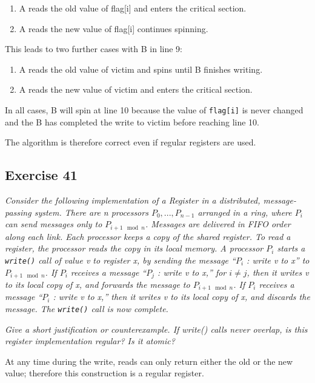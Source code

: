 \documentclass[a4paper,10pt]{article}
\begin{document}
\begin{enumerate}
\item A reads the old value of flag[i] and enters the critical section.
\item A reads the new value of flag[i] continues spinning.
\end{enumerate}

This leads to two further cases with B in line 9:

\begin{enumerate}
\item A reads the old value of victim and spins until B finishes writing.
\item A reads the new value of victim and enters the critical section.
\end{enumerate}

In all cases, B will spin at line 10 because the value of \lstinline|flag[i]| is never
changed and the B has completed the write to victim before reaching line 10.

The algorithm is therefore correct even if regular registers are used.

\subsection{Exercise 41}

\emph{Consider the following implementation of a Register in a distributed, 
message-passing system. There are n processors $P_0, ..., P_{n-1}$ arranged in
a ring, where $P_i$ can send messages only to $P_{i+1 \mod n}$. Messages are delivered
in FIFO order along each link.
Each processor keeps a copy of the shared register.
To read a register, the processor reads the copy in its local memory.
A processor $P_i$ starts a \lstinline|write()| call of value v to register x, by sending the
message ``$P_i$ : write v to x'' to $P_{i+1 \mod n}$.
If $P_i$ receives a message ``$P_j$ : write v to x,'' for $i \neq j$, then it writes v to its local
copy of x, and forwards the message to $P_{i+1 \mod n}$.
If $P_i$ receives a message ``$P_i$ : write v to x,'' then it writes v to its local copy of x,
and discards the message. The \lstinline|write()| call is now complete.}

\emph{Give a short justification or counterexample.
If write() calls never overlap, is this register implementation regular? Is it atomic?}

\vspace{3mm}

At any time during the write, reads can only return either the old or the new value;
therefore this construction is a regular register. 
\end{document}
